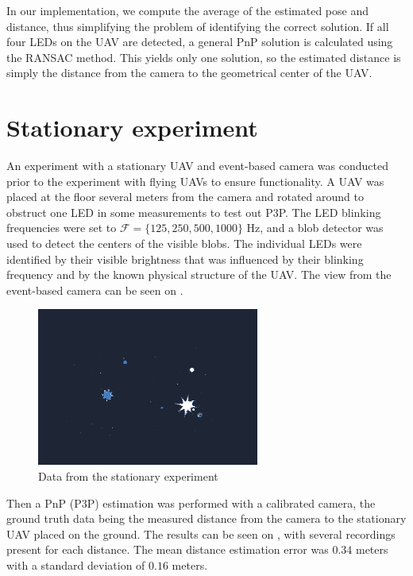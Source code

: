 In our implementation, we compute the average of the estimated pose and distance, thus simplifying the problem of identifying the correct solution. If all four \ac{LED}s on the \ac{UAV} are detected, a general \ac{PnP} solution is calculated using the \ac{RANSAC} method. This yields only one solution, so the
estimated distance is simply the distance from the camera to the geometrical center of the \ac{UAV}.

\section{Stationary experiment\label{sec:stationary_experiment}}
An experiment with a stationary \ac{UAV} and event-based camera was conducted prior to the experiment with flying \ac{UAV}s to ensure functionality.
A \ac{UAV} was placed at the floor several meters from the camera and rotated around to obstruct one \ac{LED} in some measurements to test out \ac{P3P}. The LED blinking frequencies were set to $\mathcal{F} = \{125, 250, 500, 1000\}$ Hz, and a blob detector was used to detect the centers of the visible blobs. The individual \ac{LED}s were identified by their visible brightness that was influenced by their blinking frequency and by the known physical structure of the \ac{UAV}. The view from the event-based camera can be seen on .
\begin{figure}[H]
	\centering
	\includegraphics[width=0.65\textwidth]{./fig/photos/pnpmeas.png}
	\caption{Data from the stationary experiment}
	\label{fig:pnpuav}
\end{figure}
Then a \ac{PnP} (\ac{P3P}) estimation was performed with a calibrated camera, the ground truth data being the measured distance from the camera to the
stationary \ac{UAV} placed on the ground.
The results can be seen on , with several recordings
present for each distance. The mean distance estimation error was $0.34$ meters with a standard deviation of $0.16$ meters.
